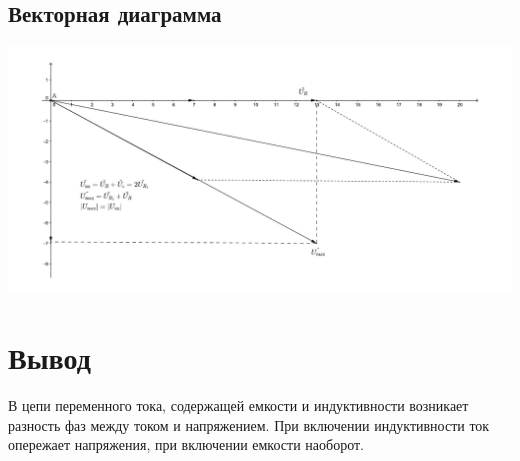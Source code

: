 \documentclass[a4paper,12pt]{article}
\begin{document}
	\subsection{Векторная диаграмма}
	\includegraphics[width = 0.8\linewidth]{pic5}

	
	\section{Вывод} 
		В цепи переменного тока, содержащей емкости и индуктивности возникает разность фаз между током и напряжением. При включении индуктивности ток опережает напряжения, при включении емкости наоборот.
\end{document}
